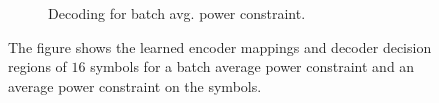 \documentclass[conference]{IEEEtran}
\begin{document}
\begin{figure}
{\begin{subfigure}{.23\textwidth}
  \caption{Decoding for batch avg. power constraint.}
\end{subfigure}}
\caption{The figure shows the learned encoder mappings and decoder decision regions of $16$ symbols for a batch average power constraint and an average power constraint on the symbols.}
\label{fig:Encoding Standard}
\end{figure}
\end{document}
